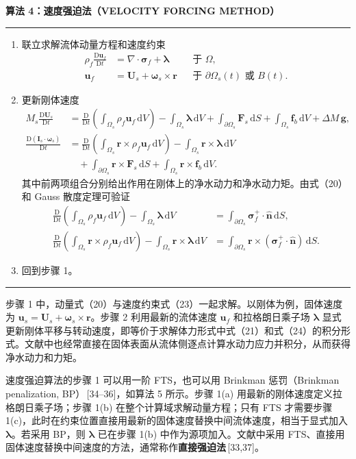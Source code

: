 \documentclass[UTF8,11pt,a4paper]{ctexart}
\newcommand{\dd}{\,\mathrm{d}}
\newcommand{\D}{\mathrm{D}}
\newenvironment{algbox}[1]{%
  \par\medskip\noindent\textbf{#1}\par\smallskip\hrule\smallskip
  \begin{enumerate}[leftmargin=2.2em,label=\arabic*.]\small
}{%
  \end{enumerate}\smallskip\hrule\par\medskip
}
\begin{document}
\begin{algbox}{算法 4：速度强迫法（VELOCITY FORCING METHOD）}
\item 联立求解流体动量方程和速度约束
\begin{align*}
\rho_f\frac{\D\bm u_f}{\D t}&=\nabla\cdot\bm\sigma_f+\bm\lambda &&\text{于 }\Omega,\\
\bm u_f&=\bm U_s+\bm\omega_s\times\bm r &&\text{于 }\partial\Omega_s(t)\text{ 或 }B(t).
\end{align*}
\item 更新刚体速度
\begin{align*}
M_s\frac{\D\bm U_s}{\D t}
&=\frac{\D}{\D t}\left(\int_{\Omega_s}\rho_f\bm u_f\dd V\right)
-\int_{\Omega_s}\bm\lambda\dd V
+\int_{\partial\Omega_s}\bm F_s\dd S
+\int_{\Omega_s}\bm f_b\dd V+\Delta M\,\bm g,\\
\frac{\D(\bm I_s\cdot\bm\omega_s)}{\D t}
&=\frac{\D}{\D t}\left(\int_{\Omega_s}\bm r\times\rho_f\bm u_f\dd V\right)
-\int_{\Omega_s}\bm r\times\bm\lambda\dd V\\
&\quad+\int_{\partial\Omega_s}\bm r\times\bm F_s\dd S
+\int_{\Omega_s}\bm r\times\bm f_b\dd V.
\end{align*}
其中前两项组合分别给出作用在刚体上的净水动力和净水动力矩。由式（20）和 Gauss 散度定理可验证
\begin{align*}
\frac{\D}{\D t}\left(\int_{\Omega_s}\rho_f\bm u_f\dd V\right)-\int_{\Omega_s}\bm\lambda\dd V
&=\int_{\partial\Omega_s}\bm\sigma_f^{+}\cdot\hat{\bm n}\dd S,\\
\frac{\D}{\D t}\left(\int_{\Omega_s}\bm r\times\rho_f\bm u_f\dd V\right)-\int_{\Omega_s}\bm r\times\bm\lambda\dd V
&=\int_{\partial\Omega_s}\bm r\times(\bm\sigma_f^{+}\cdot\hat{\bm n})\dd S.
\end{align*}
\item 回到步骤 1。
\end{algbox}

步骤 1 中，动量式（20）与速度约束式（23）一起求解。以刚体为例，固体速度为 $\bm u_s=\bm U_s+\bm\omega_s\times\bm r$。步骤 2 利用最新的流体速度 $\bm u_f$ 和拉格朗日乘子场 $\bm\lambda$ 显式更新刚体平移与转动速度，即等价于求解体力形式中式（21）和式（24）的积分形式。文献中也经常直接在固体表面从流体侧逐点计算水动力应力并积分，从而获得净水动力和力矩。

速度强迫算法的步骤 1 可以用一阶 FTS，也可以用 Brinkman 惩罚（Brinkman penalization, BP）\,[34--36]，如算法 5 所示。步骤 1(a) 用最新的刚体速度定义拉格朗日乘子场；步骤 1(b) 在整个计算域求解动量方程；只有 FTS 才需要步骤 1(c)，此时在约束位置直接用最新的固体速度替换中间流体速度，相当于显式加入 $\bm\lambda$。若采用 BP，则 $\bm\lambda$ 已在步骤 1(b) 中作为源项加入。文献中采用 FTS、直接用固体速度替换中间速度的方法，通常称作\textbf{直接强迫法}\,[33,37]。
\end{document}
